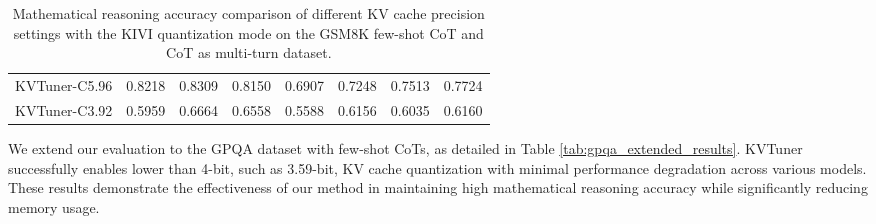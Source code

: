 \begin{table}[ht]
{\begin{tabular}{ c | r r r r r r | r }
KVTuner-C5.96 & 0.8218 & 0.8309 & 0.8150 & 0.6907 & 0.7248 & 0.7513 & 0.7724 \\
KVTuner-C3.92 & 0.5959 & 0.6664 & 0.6558 & 0.5588 & 0.6156 & 0.6035 & 0.6160 \\ \hline
\end{tabular}
}
\caption{Mathematical reasoning accuracy comparison of different KV cache precision settings with the KIVI quantization mode on the GSM8K few-shot CoT and CoT as multi-turn dataset.}
\label{tab:gsm8k_cot_and_multiturn_kvtuner_results_kivi}
\vspace{-1em}
\end{table}


We extend our evaluation to the GPQA dataset with few-shot CoTs, as detailed in Table \ref{tab:gpqa_extended_results}.
KVTuner successfully enables lower than 4-bit, such as 3.59-bit, KV cache quantization with minimal performance degradation across various models. These results demonstrate the effectiveness of our method in maintaining high mathematical reasoning accuracy while significantly reducing memory usage.


